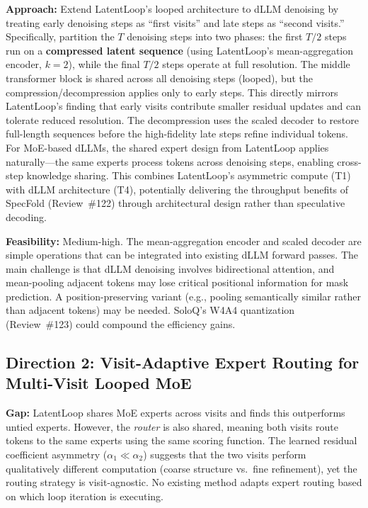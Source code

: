 \documentclass[11pt,a4paper]{article}
\begin{document}
\textbf{Approach:} Extend LatentLoop's looped architecture to dLLM denoising by treating early denoising steps as ``first visits'' and late steps as ``second visits.'' Specifically, partition the $T$ denoising steps into two phases: the first $T/2$ steps run on a \textbf{compressed latent sequence} (using LatentLoop's mean-aggregation encoder, $k{=}2$), while the final $T/2$ steps operate at full resolution. The middle transformer block is shared across all denoising steps (looped), but the compression/decompression applies only to early steps. This directly mirrors LatentLoop's finding that early visits contribute smaller residual updates and can tolerate reduced resolution. The decompression uses the scaled decoder to restore full-length sequences before the high-fidelity late steps refine individual tokens. For MoE-based dLLMs, the shared expert design from LatentLoop applies naturally---the same experts process tokens across denoising steps, enabling cross-step knowledge sharing. This combines LatentLoop's asymmetric compute (T1) with dLLM architecture (T4), potentially delivering the throughput benefits of SpecFold (Review~\#122) through architectural design rather than speculative decoding.

\textbf{Feasibility:} Medium-high. The mean-aggregation encoder and scaled decoder are simple operations that can be integrated into existing dLLM forward passes. The main challenge is that dLLM denoising involves bidirectional attention, and mean-pooling adjacent tokens may lose critical positional information for mask prediction. A position-preserving variant (e.g., pooling semantically similar rather than adjacent tokens) may be needed. SoloQ's W4A4 quantization (Review~\#123) could compound the efficiency gains.

\subsection{Direction 2: Visit-Adaptive Expert Routing for Multi-Visit Looped MoE}
\textbf{Gap:} LatentLoop shares MoE experts across visits and finds this outperforms untied experts. However, the \emph{router} is also shared, meaning both visits route tokens to the same experts using the same scoring function. The learned residual coefficient asymmetry ($\alpha_1 \ll \alpha_2$) suggests that the two visits perform qualitatively different computation (coarse structure vs.\ fine refinement), yet the routing strategy is visit-agnostic. No existing method adapts expert routing based on which loop iteration is executing.
\end{document}
